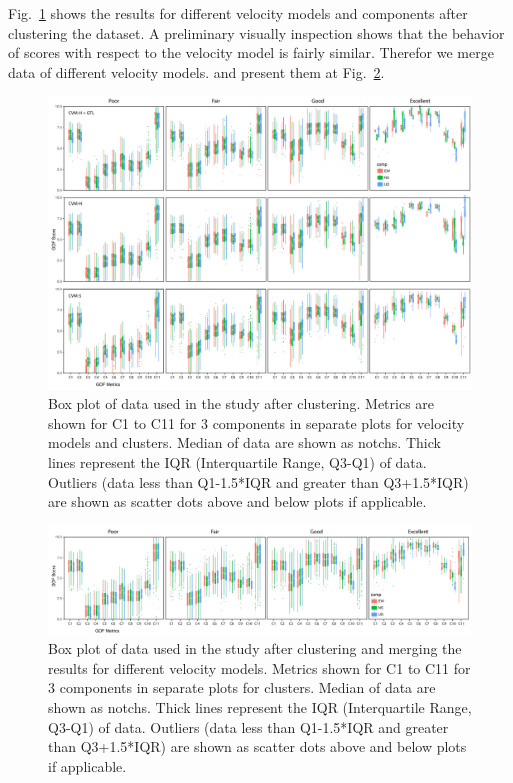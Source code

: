Fig.~\ref{fig:C_cvm_comp} shows the results for different velocity models and components after clustering the dataset. A preliminary visually inspection shows that the behavior of scores with respect to the velocity model is fairly similar. Therefor we merge data of different velocity models.  and present them at Fig.~\ref{fig:Figure_cluster_comp}. 

\begin{figure}
    \centering
    \includegraphics[width=\textwidth]{figures/pdf/Figure_6.pdf}
    \caption{Box plot of data used in the study after clustering. Metrics are shown for C1 to C11 for 3 components in separate plots for velocity models and clusters. Median of data are shown as notchs. Thick lines represent the IQR (Interquartile Range, Q3-Q1) of data. Outliers (data less than Q1-1.5*IQR and greater than Q3+1.5*IQR) are shown as scatter dots above and below plots if applicable.}
    \label{fig:C_cvm_comp}
\end{figure}

\begin{figure}
    \centering
    \includegraphics[width=\textwidth]{figures/pdf/Figure_7.pdf}
    \caption{Box plot of data used in the study after clustering and merging the results for different velocity models. Metrics shown for C1 to C11 for 3 components in separate plots for  clusters. Median of data are shown as notchs. Thick lines represent the IQR (Interquartile Range, Q3-Q1) of data. Outliers (data less than Q1-1.5*IQR and greater than Q3+1.5*IQR) are shown as scatter dots above and below plots if applicable.}
    \label{fig:Figure_cluster_comp}
\end{figure}

